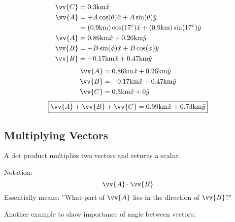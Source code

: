 \documentclass{article}
\begin{document}
\begin{align*}
    \vv{C} & = 0.3 \text{km} \hat{x} \\
    \vv{A} & = +A \cos(\theta) \hat{x} + A \sin(\theta) \hat{y} \\
           & = (0.9 \text{km}) \cos(17 \degree) \hat{x} + (0.9 \text{km}) \sin(17 \degree) \hat{y} \\
    \vv{A} & = 0.86 \text{km} \hat{x} + 0.26 \text{km} \hat{y} \\
    \vv{B} & = -B \sin(\phi) \hat{x} + B \cos(\phi) \hat{y} \\
    \vv{B} & = -0.17 \text{km} \hat{x} + 0.47 \text{km} \hat{y}
\end{align*}
\begin{align*}
    \vv{A} & = 0.86 \text{km} \hat{x} + 0.26 \text{km} \hat{y} \\
    \vv{B} & = -0.17 \text{km} \hat{x} + 0.47 \text{km} \hat{y} \\
    \vv{C} & = 0.3 \text{km} \hat{x} + 0 \hat{y}
\end{align*}
\begin{equation*}
    \boxed{\vv{A} + \vv{B} + \vv{C} = 0.99 \text{km} \hat{x} + 0.73 \text{km} \hat{y}}
\end{equation*}

\subsection{Multiplying Vectors}

A dot product multiplies two vectors and returns a scalar.

Notation:
$$ \vv{A} \cdot \vv{B} $$
Essentially means: ''What part of $ \vv{A} $ lies in the direction of $ \vv{B} $?"


Another example to show importance of angle between vectors:

\end{document}
